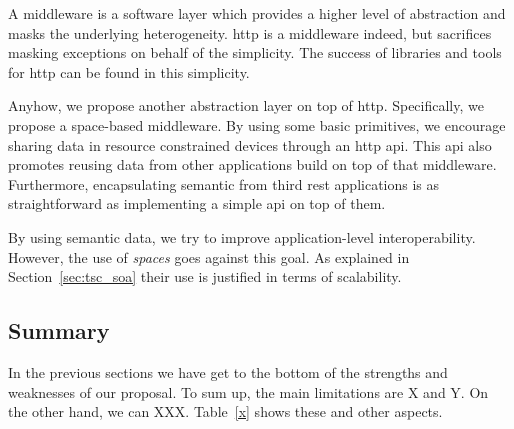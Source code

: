A middleware is a software layer which provides a higher level of abstraction and masks the underlying heterogeneity.
\ac{http} is a middleware indeed, but sacrifices masking exceptions on behalf of the simplicity. %
The success of libraries and tools for \ac{http} can be found in this simplicity.

Anyhow, we propose another abstraction layer on top of \ac{http}.
Specifically, we propose a space-based middleware.
By using some basic primitives, we encourage sharing data in resource constrained devices through an \ac{http} \ac{api}.
This \ac{api} also promotes reusing data from other applications build on top of that middleware.
Furthermore, encapsulating semantic from third \ac{rest} applications is as straightforward as implementing a simple \ac{api} on top of them.

By using semantic data, we try to improve application-level interoperability.
However, the use of \emph{spaces} goes against this goal.
As explained in Section~\ref{sec:tsc_soa} their use is justified in terms of scalability.







\subsection{Summary}

In the previous sections we have get to the bottom of the strengths and weaknesses of our proposal.
To sum up, the main limitations are X and Y.
On the other hand, we can XXX.
Table~\ref{x} shows these and other aspects.

%
%
